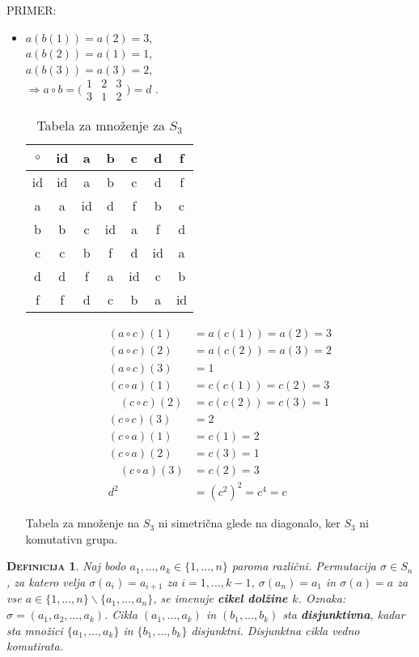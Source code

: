 \documentclass[a4paper,12pt]{article}
\newtheorem*{definicija}{\textsc{Definicija}}
\begin{document}
\noindent PRIMER: 
\begin{itemize}
\item
$a(b(1))=a(2)=3$, \\
$a(b(2))=a(1)=1$, \\
$a(b(3))=a(3)=2$, \\
$\Rightarrow a \circ b = \bigl(\begin{smallmatrix} 1 & 2 & 3 \\ 3 & 1 & 2 \end{smallmatrix}\bigr) = d$ .

\begin{table}[hpb]
\centering
\label{tab:krena}
\caption{Tabela za množenje za $S_3$}
\begin{tabular}{c|c|c|c|c|c|c}
$\circ$ & id & a & b & c & d & f \\ 
\hline
id & id & a & b & c & d & f \\
\hline
a & a & id & d & f & b & c \\
\hline
b & b & c & id & a & f & d \\
\hline
c & c & b & f & d & id & a \\
\hline
d & d & f & a & id & c & b \\
\hline
f & f & d & c & b & a & id \\
\end{tabular}
\end{table}
\begin{align*}
(a\circ c)(1)& =a(c(1))=a(2)=3 \\
(a\circ c)(2)& =a(c(2))=a(3)=2  \\
(a\circ c)(3)& =1  \\
(c\circ a)(1)& =c(c(1))=c(2)=3  \\
\quad
(c\circ c)(2)&=c(c(2))=c(3)=1  \\
(c\circ c)(3)&=2  \\
(c\circ a)(1)&=c(1)=2  \\
(c\circ a)(2)&=c(3)=1  \\
\quad
(c\circ a)(3)&=c(2)=3  \\
d^2&=(c^2)^2=c^4=c 
\end{align*}
 
Tabela za množenje na $S_3$ ni simetrična glede na diagonalo, ker $S_3$ ni komutativn grupa. \\
\end{itemize}

\begin{definicija}
Naj bodo $a_1,\ldots,a_k\in \{1,\ldots,n\}$ paroma različni.  Permutacija $\sigma \in S_n$, za katero velja $\sigma(a_i)=a_{i+1}$ za $i=1,\ldots,k-1$, $\sigma(a_n)=a_1$ in $\sigma(a)=a$ za vse \linebreak $a \in \{1,\ldots,n\}\backslash \{a_1,\ldots,a_n\}$, se imenuje \textbf{cikel dolžine $k$}. Oznaka: $\sigma=(a_1,a_2,\ldots,a_k)$. \linebreak Cikla $(a_1,\ldots,a_k)$ in $(b_1,\ldots,b_k)$ sta \textbf{disjunktivna}, kadar sta  množici $\{a_1,\ldots,a_k\}$ in $\{b_1,\ldots,b_k\}$ disjunktni.  Disjunktna cikla vedno komutirata.\\
\end{definicija}
\end{document}
